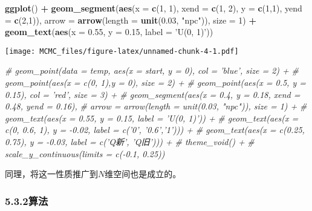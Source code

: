\documentclass[]{article}
\newenvironment{Shaded}{\begin{snugshade}}{\end{snugshade}}
\newcommand{\KeywordTok}[1]{\textcolor[rgb]{0.13,0.29,0.53}{\textbf{#1}}}
\newcommand{\DataTypeTok}[1]{\textcolor[rgb]{0.13,0.29,0.53}{#1}}
\newcommand{\DecValTok}[1]{\textcolor[rgb]{0.00,0.00,0.81}{#1}}
\newcommand{\FloatTok}[1]{\textcolor[rgb]{0.00,0.00,0.81}{#1}}
\newcommand{\StringTok}[1]{\textcolor[rgb]{0.31,0.60,0.02}{#1}}
\newcommand{\CommentTok}[1]{\textcolor[rgb]{0.56,0.35,0.01}{\textit{#1}}}
\newcommand{\OperatorTok}[1]{\textcolor[rgb]{0.81,0.36,0.00}{\textbf{#1}}}
\newcommand{\NormalTok}[1]{#1}
\begin{document}
\begin{Shaded}
\begin{Highlighting}[]
\KeywordTok{ggplot}\NormalTok{() }\OperatorTok{+}\StringTok{ }
\StringTok{  }\KeywordTok{geom_segment}\NormalTok{(}\KeywordTok{aes}\NormalTok{(}\DataTypeTok{x =} \KeywordTok{c}\NormalTok{(}\DecValTok{1}\NormalTok{, }\DecValTok{1}\NormalTok{), }\DataTypeTok{xend =} \KeywordTok{c}\NormalTok{(}\DecValTok{1}\NormalTok{, }\DecValTok{2}\NormalTok{), }\DataTypeTok{y =} \KeywordTok{c}\NormalTok{(}\DecValTok{1}\NormalTok{,}\DecValTok{1}\NormalTok{), }\DataTypeTok{yend =} \KeywordTok{c}\NormalTok{(}\DecValTok{2}\NormalTok{,}\DecValTok{1}\NormalTok{)), }
               \DataTypeTok{arrow =} \KeywordTok{arrow}\NormalTok{(}\DataTypeTok{length =} \KeywordTok{unit}\NormalTok{(}\FloatTok{0.03}\NormalTok{, }\StringTok{"npc"}\NormalTok{)), }\DataTypeTok{size =} \DecValTok{1}\NormalTok{) }\OperatorTok{+}
\StringTok{  }\KeywordTok{geom_text}\NormalTok{(}\KeywordTok{aes}\NormalTok{(}\DataTypeTok{x =} \FloatTok{0.55}\NormalTok{, }\DataTypeTok{y =} \FloatTok{0.15}\NormalTok{, }\DataTypeTok{label =} \StringTok{'U(0, 1)'}\NormalTok{))}
\end{Highlighting}
\end{Shaded}

\texttt{[image: MCMC\_files/figure-latex/unnamed-chunk-4-1.pdf]}

\begin{Shaded}
\begin{Highlighting}[]
  \CommentTok{# geom_point(data = temp, aes(x = start, y = 0), col = 'blue', size = 2) +}
  \CommentTok{# geom_point(aes(x = c(0, 1),y = 0), size = 2) +}
  \CommentTok{# geom_point(aes(x = 0.5, y = 0.15), col = 'red', size = 3) +}
  \CommentTok{# geom_segment(aes(x = 0.4, y = 0.18, xend = 0.48, yend = 0.16), }
  \CommentTok{#              arrow = arrow(length = unit(0.03, "npc")), size = 1) +}
  \CommentTok{# geom_text(aes(x = 0.55, y = 0.15, label = 'U(0, 1)')) +}
  \CommentTok{# geom_text(aes(x = c(0, 0.6, 1), y = -0.02, label = c('0', '0.6','1'))) +}
  \CommentTok{# geom_text(aes(x = c(0.25, 0.75), y = -0.03, label = c('Q新', 'Q旧'))) +}
  \CommentTok{# theme_void() +}
  \CommentTok{# scale_y_continuous(limits = c(-0.1, 0.25))}
\end{Highlighting}
\end{Shaded}

同理，将这一性质推广到\(N\)维空间也是成立的。

\subsubsection{5.3.2算法}\label{-2}
\end{document}
